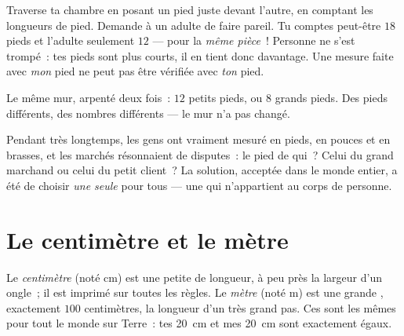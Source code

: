 \begin{example}\label{ex:g2:measuring-length:pace}
Traverse ta chambre en posant un pied juste devant l'autre, en
comptant les longueurs de pied. Demande à un adulte de faire pareil.
Tu comptes peut-être $18$ pieds et l'adulte seulement $12$ --- pour
la \emph{même pièce}~! Personne ne s'est trompé~: tes pieds sont plus
courts, il en tient donc davantage. Une mesure faite avec \emph{mon}
pied ne peut pas être vérifiée avec \emph{ton} pied.
\end{example}

\begin{omfigure}

{\small Le même mur, arpenté deux fois~: $12$ petits pieds, ou $8$
grands pieds. Des pieds différents, des nombres différents --- le mur
n'a pas changé.}
\end{omfigure}

\begin{remark}\label{rem:g2:measuring-length:argument}
Pendant très longtemps, les gens ont vraiment mesuré en pieds, en
pouces et en brasses, et les marchés résonnaient de disputes~: le
pied de qui~? Celui du grand marchand ou celui du petit client~? La
solution, acceptée dans le monde entier, a été de choisir \emph{une
seule}  pour tous --- une  qui n'appartient au corps de
personne.
\end{remark}

\section{Le centimètre et le mètre}

\begin{definition}\label{def:g2:measuring-length:units}
Le \emph{centimètre} (noté \unit{cm}) est une
petite  de longueur, à peu près la largeur d'un ongle~; il est
imprimé sur toutes les règles. Le \emph{mètre} (noté
\unit{m}) est une grande , exactement $100$ centimètres, la
longueur d'un très grand pas. Ces  sont les mêmes pour tout le
monde sur Terre~: tes \qty{20}{cm} et mes \qty{20}{cm} sont
exactement égaux.
\end{definition}

